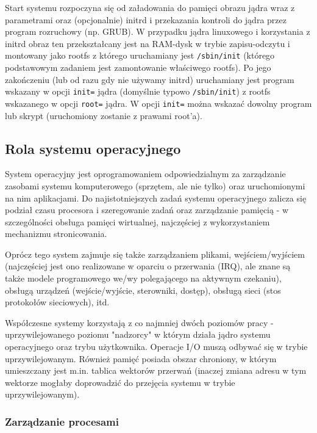 Start systemu rozpoczyna się od załadowania do pamięci obrazu jądra wraz z parametrami oraz (opcjonalnie) initrd i przekazania kontroli do jądra przez program rozruchowy (np. GRUB). W przypadku jądra linuxowego i korzystania z initrd obraz ten przekształcany jest na RAM-dysk w trybie zapisu-odczytu i montowany jako rootfs z którego uruchamiany jest \Verb#/sbin/init# (którego podstawowym zadaniem jest zamontowanie właściwego rootfs). Po jego zakończeniu (lub od razu gdy nie używamy initrd) uruchamiany jest program wskazany w opcji \Verb#init=# jądra (domyślnie typowo \Verb#/sbin/init#) z rootfs wskazanego w opcji \Verb#root=# jądra. W opcji \Verb#init=# można wskazać dowolny program lub skrypt (uruchomiony zostanie z prawami root'a).

\subsection{Rola systemu operacyjnego}

System operacyjny jest oprogramowaniem odpowiedzialnym za zarządzanie zasobami systemu komputerowego (sprzętem, ale nie tylko) oraz uruchomionymi na nim aplikacjami. Do najistotniejszych zadań systemu operacyjnego zalicza się podział czasu procesora i szeregowanie zadań oraz zarządzanie pamięcią - w szczególności obsługa pamięci wirtualnej, najczęściej z wykorzystaniem mechanizmu stronicowania.

Oprócz tego system zajmuje się także zarządzaniem plikami, wejściem/wyjściem (najczęściej jest ono realizowane w oparciu o przerwania (IRQ), ale znane są także modele programowego we/wy polegającego na aktywnym czekaniu), obsługą urządzeń (wejście/wyjście, sterowniki, dostęp), obsługą sieci (stos protokołów sieciowych), itd.

Współczesne systemy korzystają z co najmniej dwóch poziomów pracy - uprzywilejowanego poziomu "nadzorcy" w którym działa jądro systemu operacyjnego oraz trybu użytkownika. Operacje I/O muszą odbywać się w trybie uprzywilejowanym. Również pamięć posiada obszar chroniony, w którym umieszczany jest m.in. tablica wektorów przerwań (inaczej zmiana adresu w tym wektorze mogłaby doprowadzić do przejęcia systemu w trybie uprzywilejowanym).

\subsubsection{Zarządzanie procesami}

